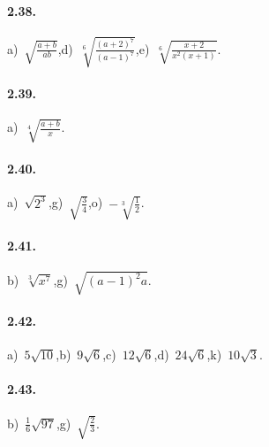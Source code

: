 \paragraph{2.38.}
a)~$\sqrt{\frac{a+b}{ab}}$,\quad d)~$\sqrt[6]{\frac{(a+2)^7}{(a-1)^7}}$,\quad e)~$\sqrt[6]{\frac{x+2}{x^2(x+1)}}$.

\paragraph{2.39.}
a)~$\sqrt[4]{\frac{a+b} x}$.

\paragraph{2.40.}
a)~$\sqrt{2^3}$,\quad g)~$\sqrt{\frac 3 4}$,\quad o)~$-\sqrt[3]{\frac 1 2}$.

\paragraph{2.41.}
b)~$\sqrt[3]{x^7}$,\quad g)~$\sqrt{(a-1)^2a}$.

\paragraph{2.42.}
a)~$5\sqrt{10}$,\quad b)~$9\sqrt 6$,\quad c)~$12\sqrt 6$,\quad d)~$24\sqrt 6$,\quad k)~$10\sqrt 3$.

\paragraph{2.43.}
b)~$\frac 1 6\sqrt{97}$,\quad g)~$\sqrt{\frac 2 3}$.

